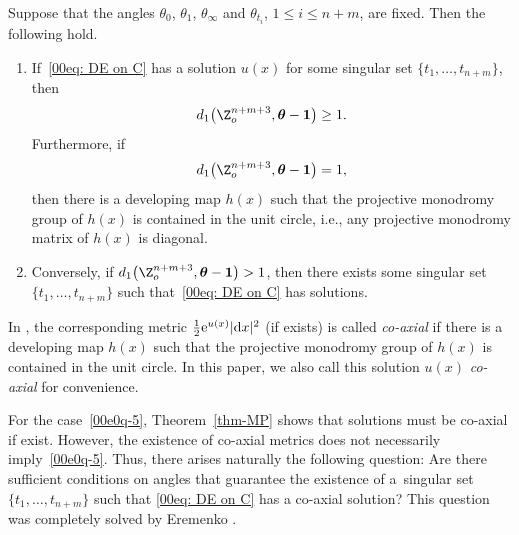 \begin{Theorem}\label{thm-MP}
 Suppose that the angles $\theta_0$, $\theta_1$, $\theta_\infty$ and
 $\theta_{t_i}$, $1\le i\le n+m$, are fixed. Then the following
 hold.
\begin{enumerate}\itemsep=0pt
\item[$1.$]
If~\eqref{00eq: DE on C} has a solution $u(x)$ for some singular set $\{t_1,\dots,t_{n+m}\}$, then
\[d_1\bigl(\Z_o^{n+m+3},{\boldsymbol\theta-\boldsymbol 1}\bigr)\geq 1.\]
Furthermore, if
 \begin{equation}\label{00e0q-5}
d_1\bigl(\Z_o^{n+m+3},{\boldsymbol\theta-\boldsymbol 1}\bigr)=1,
\end{equation}
then there is a developing map $h(x)$ such that the projective
monodromy group of $h(x)$ is contained in the unit circle, i.e., any
projective monodromy matrix of $h(x)$ is diagonal.

\item[$2.$]
Conversely, if $d_1\bigl(\Z_o^{n+m+3},{\boldsymbol\theta-\boldsymbol 1}\bigr)>1$, then there exists some singular set $\{t_1,\dots, t_{n+m}\}$ such that~\eqref{00eq: DE on C} has solutions.
\end{enumerate}
\end{Theorem}

\begin{Definition}
In \cite{Mondello-Panov}, the corresponding metric
$\frac12{\rm e}^{u(x)}|{\rm d}x|^2$ (if exists) is called \emph{co-axial} if there
is a developing map $h(x)$ such that the projective monodromy group of
$h(x)$ is contained in the unit circle. In this paper, we also call
this solution $u(x)$ \emph{co-axial} for convenience.
\end{Definition}

For the case~\eqref{00e0q-5}, Theorem~\ref{thm-MP} shows that solutions must be
co-axial if exist. However, the existence of co-axial metrics does not
necessarily imply~\eqref{00e0q-5}. Thus, there arises naturally the
following question: Are there sufficient conditions on angles that
guarantee the existence of a~singular set $\{t_1,\dots,t_{n+m}\}$ such that
\eqref{00eq: DE on C} has a co-axial solution? This question was
completely solved by Eremenko \cite{Coaxial}.


